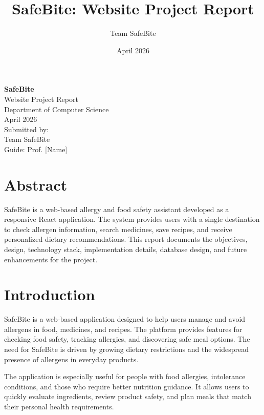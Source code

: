 \documentclass[12pt,a4paper]{report}
\title{SafeBite: Website Project Report}
\author{Team SafeBite}
\date{April 2026}
\begin{document}
\begin{titlepage}
  \centering
  {\Large \textbf{SafeBite}}\\[1em]
  {\large Website Project Report}\\[2em]
  {\large Department of Computer Science}\\[0.5em]
  {\large April 2026}\\[4em]
  {\large Submitted by:}\\[0.5em]
  {\large Team SafeBite}\\[0.5em]
  {\large Guide: Prof. [Name]}\\[8em]
  \vfill
  \vspace{2em}
\end{titlepage}

\chapter*{Abstract}
SafeBite is a web-based allergy and food safety assistant developed as a responsive React application. The system provides users with a single destination to check allergen information, search medicines, save recipes, and receive personalized dietary recommendations. This report documents the objectives, design, technology stack, implementation details, database design, and future enhancements for the project.

\vfill
\tableofcontents
\cleardoublepage
{}

\chapter{Introduction}
SafeBite is a web-based application designed to help users manage and avoid allergens in food, medicines, and recipes. The platform provides features for checking food safety, tracking allergies, and discovering safe meal options. The need for SafeBite is driven by growing dietary restrictions and the widespread presence of allergens in everyday products.

The application is especially useful for people with food allergies, intolerance conditions, and those who require better nutrition guidance. It allows users to quickly evaluate ingredients, review product safety, and plan meals that match their personal health requirements.
\end{document}
